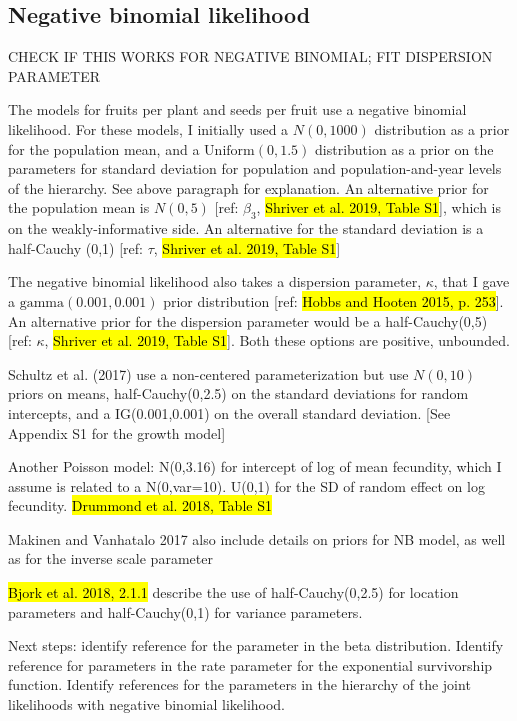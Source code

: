 \documentclass[12pt, oneside, titlepage]{article}   	%
\begin{document}

\subsection*{Negative binomial likelihood}
CHECK IF THIS WORKS FOR NEGATIVE BINOMIAL; FIT DISPERSION PARAMETER

The models for fruits per plant and seeds per fruit use a negative binomial likelihood. For these models, I initially used a $N(0,1000)$ distribution as a prior for the population mean, and a $\mathrm{Uniform}(0,1.5)$ distribution as a prior on the parameters for standard deviation for population and population-and-year levels of the hierarchy. See above paragraph for explanation. An alternative prior for the population mean is $N(0,5)$ [ref: $\beta_3$, \hl{Shriver et al. 2019, Table S1}], which is on the weakly-informative side. An alternative for the standard deviation is a half-Cauchy (0,1) [ref: $\tau$, \hl{Shriver et al. 2019, Table S1}]

 The negative binomial likelihood also takes a dispersion parameter, $\kappa$, that I gave a $\mathrm{gamma}(0.001,0.001)$ prior distribution [ref: \hl{Hobbs and Hooten 2015, p. 253}]. An alternative prior for the dispersion parameter would be a half-Cauchy(0,5) [ref: $\kappa$, \hl{Shriver et al. 2019, Table S1}]. Both these options are positive, unbounded. 

Schultz et al. (2017) use a non-centered parameterization but use $N(0,10)$ priors on means, half-Cauchy(0,2.5) on the standard deviations for random intercepts, and a IG(0.001,0.001) on the overall standard deviation. [See Appendix S1 for the growth model]

Another Poisson model: N(0,3.16) for intercept of log of mean fecundity, which I assume is related to a N(0,var=10). U(0,1) for the SD of random effect on log fecundity. \hl{Drummond et al. 2018, Table S1}

Makinen and Vanhatalo 2017 also include details on priors for NB model, as well as for the inverse scale parameter

\hl{Bjork et al. 2018, 2.1.1} describe the use of half-Cauchy(0,2.5) for location parameters and half-Cauchy(0,1) for variance parameters.

Next steps: identify reference for the parameter in the beta distribution. Identify reference for parameters in the rate parameter for the exponential survivorship function. Identify references for the parameters in the hierarchy of the joint likelihoods with negative binomial likelihood. 
\end{document}

